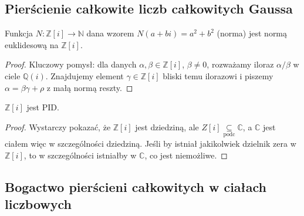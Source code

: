\subsection*{Pierścienie całkowite liczb całkowitych Gaussa}

\begin{theorem}
Funkcja $N: \mathbb{Z}[i] \to \mathbb{N}$ dana wzorem $N(a+bi) = a^2 + b^2$ (norma) jest normą euklidesową na $\mathbb{Z}[i]$.
\end{theorem}

\begin{proof}
Kluczowy pomysł: dla danych $\alpha, \beta \in \mathbb{Z}[i]$, $\beta \neq 0$, rozważamy iloraz $\alpha/\beta$ w ciele $\mathbb{Q}(i)$. Znajdujemy element $\gamma \in \mathbb{Z}[i]$ bliski temu ilorazowi i piszemy $\alpha = \beta\gamma + \rho$ z małą normą reszty.
\end{proof}

\begin{corollary}
$\mathbb{Z}[i]$ jest PID.
\end{corollary}
\begin{proof}
	Wystarczy pokazać, że $\mathbb{Z}\left[ i \right] $ jest dziedziną, ale $Z\left[ i \right] \underset{\scriptscriptstyle\text{podc}}{\subseteq} \mathbb{C}$, a $\mathbb{C}$ jest ciałem więc w szczególności dziedziną. Jeśli by istniał jakikolwiek dzielnik zera w $\mathbb{Z}\left[ i \right] $, to w szczególności istniałby w $\mathbb{C}$, co jest niemożliwe.
\end{proof} 

\subsection*{Bogactwo pierścieni całkowitych w ciałach liczbowych}

